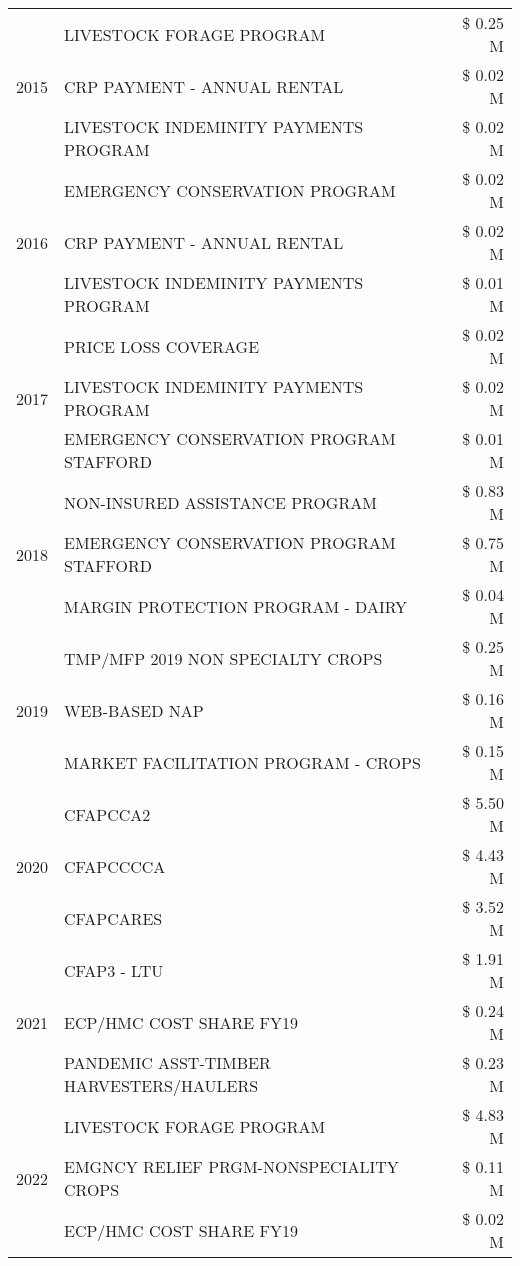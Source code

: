 \begin{tabular}{llr}
\cline{1-3}
\multirow[t]{3}{*}{2015} & LIVESTOCK FORAGE PROGRAM & \$ 0.25 M \\
 & CRP PAYMENT - ANNUAL RENTAL & \$ 0.02 M \\
 & LIVESTOCK INDEMINITY PAYMENTS PROGRAM & \$ 0.02 M \\
\cline{1-3}
\multirow[t]{3}{*}{2016} & EMERGENCY CONSERVATION PROGRAM & \$ 0.02 M \\
 & CRP PAYMENT - ANNUAL RENTAL & \$ 0.02 M \\
 & LIVESTOCK INDEMINITY PAYMENTS PROGRAM & \$ 0.01 M \\
\cline{1-3}
\multirow[t]{3}{*}{2017} & PRICE LOSS COVERAGE & \$ 0.02 M \\
 & LIVESTOCK INDEMINITY PAYMENTS PROGRAM & \$ 0.02 M \\
 & EMERGENCY CONSERVATION PROGRAM STAFFORD & \$ 0.01 M \\
\cline{1-3}
\multirow[t]{3}{*}{2018} & NON-INSURED ASSISTANCE PROGRAM & \$ 0.83 M \\
 & EMERGENCY CONSERVATION PROGRAM STAFFORD & \$ 0.75 M \\
 & MARGIN PROTECTION PROGRAM - DAIRY & \$ 0.04 M \\
\cline{1-3}
\multirow[t]{3}{*}{2019} & TMP/MFP 2019 NON SPECIALTY CROPS & \$ 0.25 M \\
 & WEB-BASED NAP & \$ 0.16 M \\
 & MARKET FACILITATION PROGRAM - CROPS & \$ 0.15 M \\
\cline{1-3}
\multirow[t]{3}{*}{2020} & CFAPCCA2 & \$ 5.50 M \\
 & CFAPCCCCA & \$ 4.43 M \\
 & CFAPCARES & \$ 3.52 M \\
\cline{1-3}
\multirow[t]{3}{*}{2021} & CFAP3 - LTU & \$ 1.91 M \\
 & ECP/HMC COST SHARE FY19 & \$ 0.24 M \\
 & PANDEMIC ASST-TIMBER HARVESTERS/HAULERS & \$ 0.23 M \\
\cline{1-3}
\multirow[t]{3}{*}{2022} & LIVESTOCK FORAGE PROGRAM & \$ 4.83 M \\
 & EMGNCY RELIEF PRGM-NONSPECIALITY CROPS & \$ 0.11 M \\
 & ECP/HMC COST SHARE FY19 & \$ 0.02 M \\
\cline{1-3}
\bottomrule
\end{tabular}
